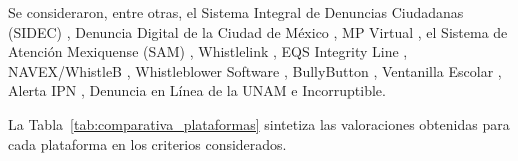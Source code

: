 Se consideraron, entre otras, el Sistema Integral de Denuncias Ciudadanas (SIDEC) \cite{sfp_sidec}, Denuncia Digital de la Ciudad de México \cite{cdmx_denuncia_digital}, MP Virtual \cite{fgjcdmx_mp_virtual}, el Sistema de Atención Mexiquense (SAM) \cite{secogem_sam}, Whistlelink \cite{whistlelink}, EQS Integrity Line \cite{eqs_integrity_line}, NAVEX/WhistleB \cite{navex_whistleb}, Whistleblower Software \cite{whistleblower_software}, BullyButton \cite{bully_button}, Ventanilla Escolar \cite{sep_ventanilla_escolar}, Alerta IPN \cite{ipn_alerta}, Denuncia en Línea de la UNAM \cite{unam_ddu_denuncia} e Incorruptible.

La Tabla~\ref{tab:comparativa_plataformas} sintetiza las valoraciones obtenidas para cada plataforma en los criterios considerados.

\footnotesize
\renewcommand{\arraystretch}{1.2}
\setlength{\tabcolsep}{3pt}
